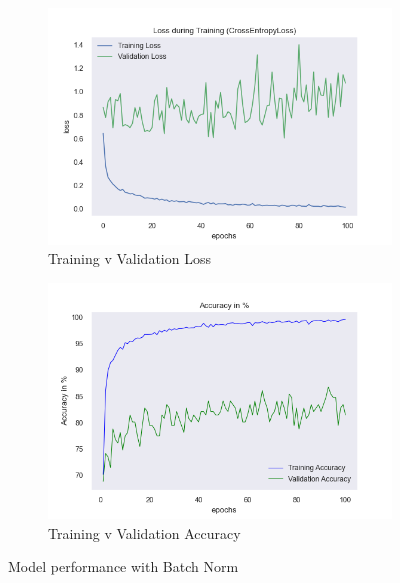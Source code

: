 \documentclass[a4paper]{article}
\begin{document}
\begin{figure}[H]
\centering
\begin{subfigure}{0.5\textwidth}
  \centering
  \includegraphics[width=1\linewidth]{img/baptiste/baptiste_100epoches_val_loss__Dropouts_False__BatchNorm_True.png}
  \caption{Training v Validation Loss}
  \label{fig:sub1}
\end{subfigure}%
\begin{subfigure}{0.5\textwidth}
  \centering
  \includegraphics[width=1\linewidth]{img/baptiste/baptiste_100epoches_train_accuracy__Dropouts_False__BatchNorm_True.png}
  \caption{Training v Validation Accuracy}
  \label{fig:sub2}
\end{subfigure}
\caption{Model performance with Batch Norm}
\label{fig:with-batchnorm}
\end{figure}
\end{document}
